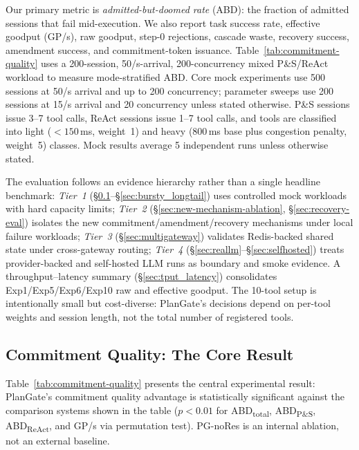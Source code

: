 \documentclass[sigconf,review,anonymous]{acmart}
\begin{document}
Our primary metric is \emph{admitted-but-doomed rate} (ABD): the fraction of admitted sessions that fail mid-execution. We also report task success rate, effective goodput (GP/s), raw goodput, step-0 rejections, cascade waste, recovery success, amendment success, and commitment-token issuance. Table~\ref{tab:commitment-quality} uses a 200-session, 50/s-arrival, 200-concurrency mixed P\&S/ReAct workload to measure mode-stratified ABD. Core mock experiments use 500 sessions at 50/s arrival and up to 200 concurrency; parameter sweeps use 200 sessions at 15/s arrival and 20 concurrency unless stated otherwise. P\&S sessions issue 3--7 tool calls, ReAct sessions issue 1--7 tool calls, and tools are classified into light ($<150$\,ms, weight~1) and heavy (800\,ms base plus congestion penalty, weight~5) classes. Mock results average 5 independent runs unless otherwise stated.

The evaluation follows an evidence hierarchy rather than a single headline benchmark: \emph{Tier~1} (\S\ref{sec:commitment_quality}--\S\ref{sec:bursty_longtail}) uses controlled mock workloads with hard capacity limits; \emph{Tier~2} (\S\ref{sec:new-mechanism-ablation}, \S\ref{sec:recovery-eval}) isolates the new commitment/amendment/recovery mechanisms under local failure workloads; \emph{Tier~3} (\S\ref{sec:multigateway}) validates Redis-backed shared state under cross-gateway routing; \emph{Tier~4} (\S\ref{sec:reallm}--\S\ref{sec:selfhosted}) treats provider-backed and self-hosted LLM runs as boundary and smoke evidence. A throughput--latency summary (\S\ref{sec:tput_latency}) consolidates Exp1/Exp5/Exp6/Exp10 raw and effective goodput. The 10-tool setup is intentionally small but cost-diverse: PlanGate's decisions depend on per-tool weights and session length, not the total number of registered tools.

\subsection{Commitment Quality: The Core Result}
\label{sec:commitment_quality}



Table~\ref{tab:commitment-quality} presents the central experimental result: PlanGate's commitment quality advantage is statistically significant against the comparison systems shown in the table ($p < 0.01$ for ABD\textsubscript{total}, ABD\textsubscript{P\&S}, ABD\textsubscript{ReAct}, and GP/s via permutation test). PG-noRes is an internal ablation, not an external baseline.
\end{document}
